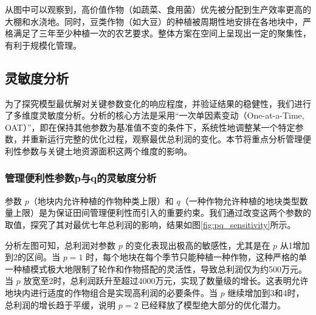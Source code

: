 从图中可以观察到，高价值作物（如蔬菜、食用菌）优先被分配到生产效率更高的大棚和水浇地。同时，豆类作物（如大豆）的种植被周期性地安排在各地块中，严格满足了三年至少种植一次的农艺要求。整体方案在空间上呈现出一定的聚集性，有利于规模化管理。




\subsection{灵敏度分析}

为了探究模型最优解对关键参数变化的响应程度，并验证结果的稳健性，我们进行了多维度灵敏度分析。分析的核心方法是采用“一次单因素变动（One-at-a-Time, OAT）”，即在保持其他参数为基准值不变的条件下，系统性地调整某一个特定参数，并重新运行完整的优化过程，观察最优总利润的变化。本节将重点分析管理便利性参数与关键土地资源面积这两个维度的影响。

\subsubsection{管理便利性参数p与q的灵敏度分析}

参数 $p$（地块内允许种植的作物种类上限）和 $q$（一种作物允许种植的地块类型数量上限）是为保证田间管理便利性而引入的重要约束。我们通过改变这两个参数的取值，探究了其对最优七年总利润的影响，结果如图\ref{fig:pq_sensitivity}所示。

分析左图可知，总利润对参数 $p$ 的变化表现出极高的敏感性，尤其是在 $p$ 从1增加到2的区间。当 $p=1$ 时，每个地块在每个季节只能种植一种作物，这种严格的单一种植模式极大地限制了轮作和作物搭配的灵活性，导致总利润仅为约500万元。当 $p$ 放宽至2时，总利润跃升至超过4000万元，实现了数量级的增长。这表明允许地块内进行适度的作物组合是实现高利润的必要条件。当 $p$ 继续增加到3和4时，总利润的增长趋于平缓，说明 $p=2$ 已经释放了模型绝大部分的优化潜力。

